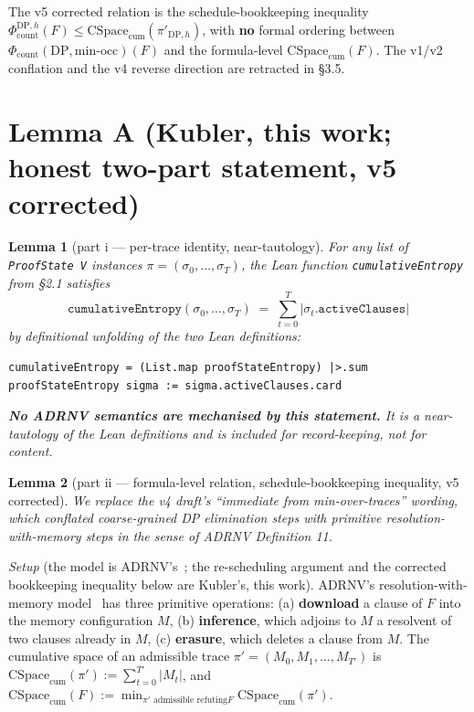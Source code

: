 \documentclass[11pt,a4paper]{article}
\newtheorem{lemma}{Lemma}
\theoremstyle{remark}
\begin{document}
The v5 corrected relation is the schedule-bookkeeping inequality
$\Phi_{\mathrm{count}}^{\mathrm{DP},h}(F) \le
\mathrm{CSpace}_{\mathrm{cum}}(\pi'_{\mathrm{DP},h})$, with \textbf{no}
formal ordering between
$\Phi_{\mathrm{count}}(\mathrm{DP},\mathrm{min\text{-}occ})(F)$ and the
formula-level $\mathrm{CSpace}_{\mathrm{cum}}(F)$. The v1/v2 conflation
and the v4 reverse direction are retracted in \S3.5.

\section{Lemma A (Kubler, this work; honest two-part statement, v5 corrected)}

\begin{lemma}[part i --- per-trace identity, near-tautology]
\sloppy
For any list of \texttt{ProofState V} instances $\pi = (\sigma_0, \ldots,
\sigma_T)$, the Lean function \texttt{cumulativeEntropy} from \S2.1 satisfies
\[
\texttt{cumulativeEntropy}(\sigma_0, \ldots, \sigma_T) \;=\;
\sum_{t=0}^{T} |\sigma_t.\texttt{activeClauses}|
\]
by definitional unfolding of the two Lean definitions:
\begin{lstlisting}[basicstyle=\ttfamily\small]
cumulativeEntropy = (List.map proofStateEntropy) |>.sum
proofStateEntropy sigma := sigma.activeClauses.card
\end{lstlisting}
\textbf{No ADRNV semantics are mechanised by this statement.} It is a
near-tautology of the Lean definitions and is included for record-keeping,
not for content.
\end{lemma}

\begin{lemma}[part ii --- formula-level relation, schedule-bookkeeping
inequality, v5 corrected]
We replace the v4 draft's ``immediate from min-over-traces'' wording,
which conflated coarse-grained DP elimination steps with primitive
resolution-with-memory steps in the sense of ADRNV Definition 11.
\end{lemma}

\begingroup\sloppy
\textit{Setup} (the model is ADRNV's~\cite{ADRNV2017}; the re-scheduling
argument and the corrected bookkeeping inequality below are Kubler's,
this work). ADRNV's resolution-with-memory
model~\cite{ADRNV2017} has three primitive operations:
(a) \textbf{download} a clause of $F$ into the memory configuration $M$,
(b) \textbf{inference}, which adjoins to $M$ a resolvent of two clauses
already in $M$, (c) \textbf{erasure}, which deletes a clause from $M$. The
cumulative space of an admissible trace
$\pi' = (M_0, M_1, \ldots, M_{T'})$ is
$\mathrm{CSpace}_{\mathrm{cum}}(\pi') := \sum_{t=0}^{T'} |M_t|$, and
$\mathrm{CSpace}_{\mathrm{cum}}(F) := \min_{\pi' \text{ admissible refuting
} F} \mathrm{CSpace}_{\mathrm{cum}}(\pi')$.
\end{document}
